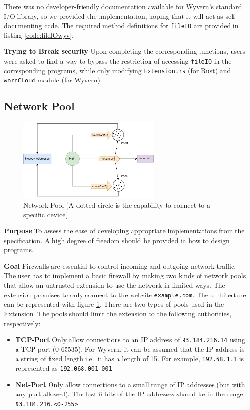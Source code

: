 There was no developer-friendly documentation available for Wyvern's standard I/O library, so we provided the implementation, hoping that it will act as self-documenting code. The required method definitions for \texttt{fileIO} are provided in listing \ref{code:fileIOwyv}.

\noindent
\textbf{Trying to Break security} Upon completing the corresponding functions, users were asked to find a way to bypass the restriction of accessing \texttt{fileIO} in the corresponding programs, while only modifying \texttt{Extension.rs} (for Rust) and \texttt{wordCloud} module (for Wyvern).

\subsection{Network Pool}\label{sec:networkPool}

\begin{figure}[htbp]
\centering
\includegraphics[width=2.8in]{figures/network.jpg}
\caption{Network Pool (A dotted circle is the capability to connect to a specific device)}
\label{fig:network}
\end{figure}

\noindent
\textbf{Purpose} To assess the ease of developing appropriate implementations from the specification. A high degree of freedom should be provided in how to design programs.

\noindent
\textbf{Goal} Firewalls are essential to control incoming and outgoing network traffic. The user has to implement a basic firewall by making two kinds of network pools that allow an untrusted extension to use the network in limited ways. The extension promises to only connect to the website \texttt{example.com}. The architecture can be represented with figure \ref{fig:network}. There are two types of pools used in the Extension. The pools should limit the extension to the following authorities, respectively:

\begin{itemize}
    \item \textbf{TCP-Port} Only allow connections to an IP address of \texttt{93.184.216.14} using a TCP port (0-65535). For Wyvern, it can be assumed that the IP address is a string of fixed length i.e.\ it has a length of 15. For example, \texttt{192.68.1.1} is represented as \texttt{192.068.001.001}
    \item \textbf{Net-Port} Only allow connections to a small range of IP addresses (but with any port allowed). The last 8 bits of the IP addresses should be in the range \texttt{93.184.216.<0-255>}
\end{itemize}

